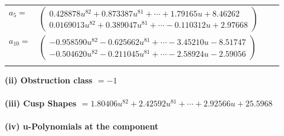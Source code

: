 \documentclass[1p]{elsarticle_modified}
\theoremstyle{definition}
\begin{document}
\begin{tabular}{m{7pt} m{180pt} m{7pt} m{180pt} }
\flushright $a_{5}=$&$\begin{pmatrix}0.428878 u^{82}+0.873387 u^{81}+\cdots+1.79165 u+8.46262\\0.0169013 u^{82}+0.389047 u^{81}+\cdots-0.110312 u+2.97668\end{pmatrix}$ \\
\flushright $a_{10}=$&$\begin{pmatrix}-0.958590 u^{82}-0.625662 u^{81}+\cdots-3.45210 u-8.51747\\-0.504620 u^{82}-0.211045 u^{81}+\cdots-2.58924 u-2.59056\end{pmatrix}$\\&\end{tabular}
\flushleft \textbf{(ii) Obstruction class $= -1$}\\~\\
\flushleft \textbf{(iii) Cusp Shapes $= 1.80406 u^{82}+2.42592 u^{81}+\cdots+2.92566 u+25.5968$}\\~\\
\newpage\renewcommand{\arraystretch}{1}
\flushleft \textbf{(iv) u-Polynomials at the component}\newline \\
\end{document}
